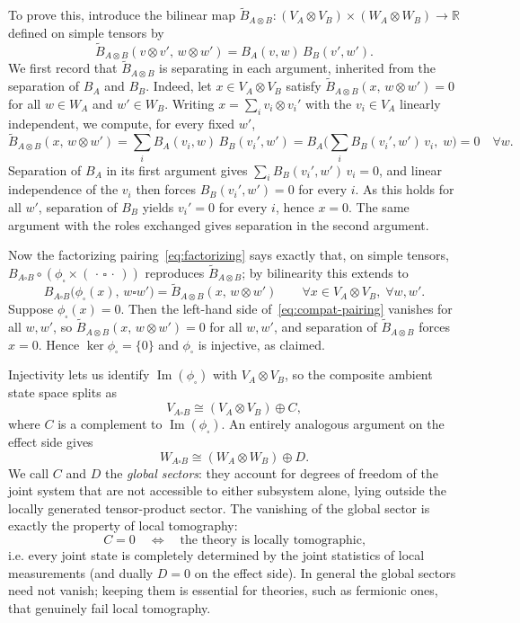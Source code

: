 \documentclass[prl,aps,10pt,superscriptaddress, floatfix]{revtex4-2}
\begin{document}
To prove this, introduce the bilinear map $\widetilde B_{A\otimes B}:(V_A\otimes V_B)\times(W_A\otimes W_B)\to\mathbb{R}$ defined on simple tensors by
\[
\widetilde B_{A\otimes B}(v\otimes v',\,w\otimes w')=B_A(v,w)\,B_B(v',w').
\]
We first record that $\widetilde B_{A\otimes B}$ is separating in each argument, inherited from the separation of $B_A$ and $B_B$. Indeed, let $x\in V_A\otimes V_B$ satisfy $\widetilde B_{A\otimes B}(x,\,w\otimes w')=0$ for all $w\in W_A$ and $w'\in W_B$. Writing $x=\sum_i v_i\otimes v_i'$ with the $v_i\in V_A$ linearly independent, we compute, for every fixed $w'$,
\[
\widetilde B_{A\otimes B}(x,\,w\otimes w')
=\sum_i B_A(v_i,w)\,B_B(v_i',w')
=B_A\!\Big(\sum_i B_B(v_i',w')\,v_i,\;w\Big)=0
\quad\forall w.
\]
Separation of $B_A$ in its first argument gives $\sum_i B_B(v_i',w')\,v_i=0$, and linear independence of the $v_i$ then forces $B_B(v_i',w')=0$ for every $i$. As this holds for all $w'$, separation of $B_B$ yields $v_i'=0$ for every $i$, hence $x=0$. The same argument with the roles exchanged gives separation in the second argument.

Now the factorizing pairing~\eqref{eq:factorizing} says exactly that, on simple tensors, $B_{A\square B}\circ(\phi_\square\times(\,\cdot\,\square\,\cdot\,))$ reproduces $\widetilde B_{A\otimes B}$; by bilinearity this extends to
\begin{equation}\label{eq:compat-pairing}
B_{A\square B}\big(\phi_\square(x),\,w\square w'\big)=\widetilde B_{A\otimes B}(x,\,w\otimes w')
\qquad\forall x\in V_A\otimes V_B,\;\forall w,w'.
\end{equation}
Suppose $\phi_\square(x)=0$. Then the left-hand side of~\eqref{eq:compat-pairing} vanishes for all $w,w'$, so $\widetilde B_{A\otimes B}(x,\,w\otimes w')=0$ for all $w,w'$, and separation of $\widetilde B_{A\otimes B}$ forces $x=0$. Hence $\ker\phi_\square=\{0\}$ and $\phi_\square$ is injective, as claimed.

Injectivity lets us identify $\operatorname{Im}(\phi_\square)$ with $V_A\otimes V_B$, so the composite ambient state space splits as
\begin{equation}\label{eq:V-decomp}
V_{A\square B}\cong (V_A\otimes V_B)\oplus C,
\end{equation}
where $C$ is a complement to $\operatorname{Im}(\phi_\square)$. An entirely analogous argument on the effect side gives
\begin{equation}\label{eq:W-decomp}
W_{A\square B}\cong (W_A\otimes W_B)\oplus D.
\end{equation}
We call $C$ and $D$ the \emph{global sectors}: they account for degrees of freedom of the joint system that are not accessible to either subsystem alone, lying outside the locally generated tensor-product sector. The vanishing of the global sector is exactly the property of local tomography:
\[
C=0
\quad\Longleftrightarrow\quad
\text{the theory is locally tomographic,}
\]
i.e. every joint state is completely determined by the joint statistics of local measurements (and dually $D=0$ on the effect side). In general the global sectors need not vanish; keeping them is essential for theories, such as fermionic ones, that genuinely fail local tomography.
\end{document}
